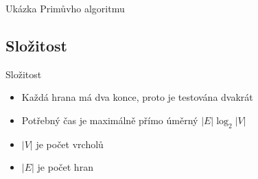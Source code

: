 \documentclass[10pt, hyperref={unicode}]{beamer}[3.5.2020]
\begin{document}
\begin{frame}{Ukázka Primůvho algoritmu}
\begin{figure}[h]
    \end{figure}
\end{frame}

\subsection{Složitost}

\begin{frame}{Složitost}
    \begin{itemize}
        \item Každá hrana má dva konce, proto je testována dvakrát
        \item Potřebný čas je maximálně přímo úměrný $|E| \log_2 |V|$
        \item $|V|$ je počet vrcholů
        \item $|E|$ je počet hran
    \end{itemize}
\end{frame}
\end{document}
